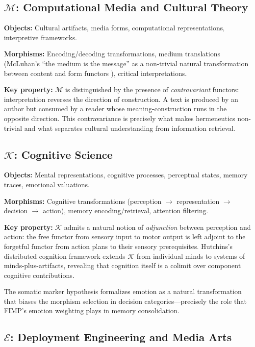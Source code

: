 \documentclass[11pt,a4paper]{article}
\begin{document}
\subsection{$\mathcal{M}$: Computational Media and Cultural Theory}

\textbf{Objects:} Cultural artifacts, media forms, computational representations, interpretive frameworks.

\textbf{Morphisms:} Encoding/decoding transformations, medium translations (McLuhan's ``the medium is the message'' as a non-trivial natural transformation between content and form functors \citep{mcluhan1964understanding}), critical interpretations.

\textbf{Key property:} $\mathcal{M}$ is distinguished by the presence of \emph{contravariant} functors: interpretation reverses the direction of construction. A text is produced by an author but consumed by a reader whose meaning-construction runs in the opposite direction. This contravariance is precisely what makes hermeneutics non-trivial and what separates cultural understanding from information retrieval.

\subsection{$\mathcal{K}$: Cognitive Science}

\textbf{Objects:} Mental representations, cognitive processes, perceptual states, memory traces, emotional valuations.

\textbf{Morphisms:} Cognitive transformations (perception $\to$ representation $\to$ decision $\to$ action), memory encoding/retrieval, attention filtering.

\textbf{Key property:} $\mathcal{K}$ admits a natural notion of \emph{adjunction} between perception and action: the free functor from sensory input to motor output is left adjoint to the forgetful functor from action plans to their sensory prerequisites. Hutchins's distributed cognition framework \citep{hutchins1995cognition} extends $\mathcal{K}$ from individual minds to systems of minds-plus-artifacts, revealing that cognition itself is a colimit over component cognitive contributions.

The somatic marker hypothesis \citep{damasio1994descartes} formalizes emotion as a natural transformation that biases the morphism selection in decision categories---precisely the role that FIMP's emotion weighting plays in memory consolidation.

\subsection{$\mathcal{E}$: Deployment Engineering and Media Arts}
\end{document}
